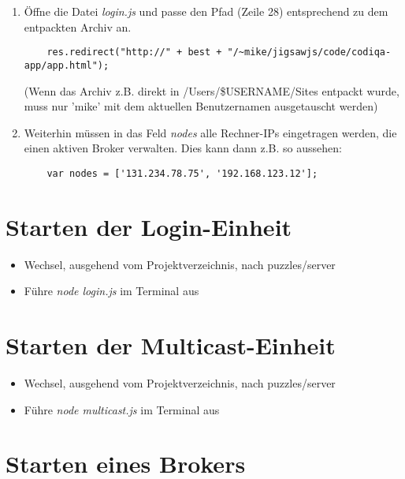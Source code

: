 \documentclass[]{article}
\begin{document}
\begin{enumerate}
  \item Öffne die Datei \emph{login.js} und passe den Pfad (Zeile 28) entsprechend zu dem entpackten Archiv an.
  
  \begin{verbatim}
    res.redirect("http://" + best + "/~mike/jigsawjs/code/codiqa-app/app.html");
  \end{verbatim}
  
  (Wenn das Archiv z.B. direkt in /Users/\$USERNAME/Sites entpackt wurde, muss nur 'mike' mit dem aktuellen
  Benutzernamen ausgetauscht werden)
  
  \item Weiterhin müssen in das Feld \emph{nodes} alle Rechner-IPs eingetragen werden, die einen aktiven Broker verwalten.
  Dies kann dann z.B. so aussehen:
  \begin{verbatim}
    var nodes = ['131.234.78.75', '192.168.123.12'];
  \end{verbatim}
  
\end{enumerate}

\section{Starten der Login-Einheit} %
\label{sec:starten_eines_brokers}

\begin{itemize}
  \item Wechsel, ausgehend vom Projektverzeichnis, nach puzzles/server
  \item Führe \emph{node login.js} im Terminal aus
\end{itemize}


\section{Starten der Multicast-Einheit} %
\label{sec:starten_der_multicast_einheit}

\begin{itemize}
  \item Wechsel, ausgehend vom Projektverzeichnis, nach puzzles/server
  \item Führe \emph{node multicast.js} im Terminal aus
\end{itemize}


\section{Starten eines Brokers} %
\label{sec:starten_eines_brokers}
\end{document}

